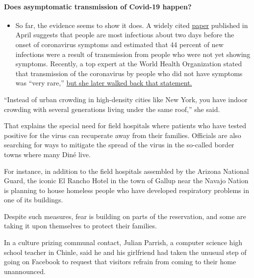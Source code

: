 \begin{itemize}
{  \paragraph{Does asymptomatic transmission of Covid-19
  happen?}\label{does-asymptomatic-transmission-of-covid-19-happen}}

  \begin{itemize}
  \tightlist
  \item
    So far, the evidence seems to show it does. A widely cited
    \href{https://www.nature.com/articles/s41591-020-0869-5}{paper}
    published in April suggests that people are most infectious about
    two days before the onset of coronavirus symptoms and estimated that
    44 percent of new infections were a result of transmission from
    people who were not yet showing symptoms. Recently, a top expert at
    the World Health Organization stated that transmission of the
    coronavirus by people who did not have symptoms was ``very rare,''
    \href{https://www.nytimes.com/2020/06/09/world/coronavirus-updates.html?action=click\&pgtype=Article\&state=default\&region=MAIN_CONTENT_3\&context=storylines_faq\#link-1f302e21}{but
    she later walked back that statement.}
  \end{itemize}
\end{itemize}

``Instead of urban crowding in high-density cities like New York, you
have indoor crowding with several generations living under the same
roof,'' she said.

That explains the special need for field hospitals where patients who
have tested positive for the virus can recuperate away from their
families. Officials are also searching for ways to mitigate the spread
of the virus in the so-called border towns where many Diné live.

For instance, in addition to the field hospitals assembled by the
Arizona National Guard, the iconic El Rancho Hotel in the town of Gallup
near the Navajo Nation is planning to house homeless people who have
developed respiratory problems in one of its buildings.

Despite such measures, fear is building on parts of the reservation, and
some are taking it upon themselves to protect their families.

In a culture prizing communal contact, Julian Parrish, a computer
science high school teacher in Chinle, said he and his girlfriend had
taken the unusual step of going on Facebook to request that visitors
refrain from coming to their home unannounced.

